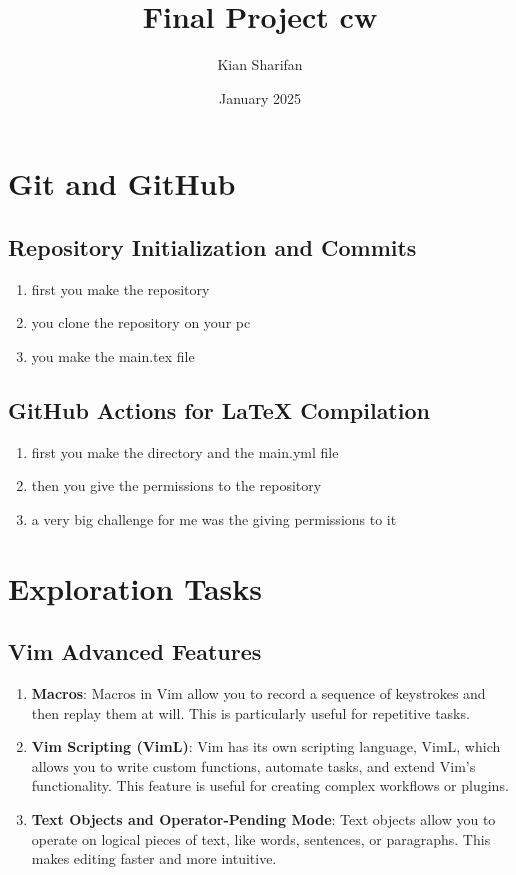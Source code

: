 \documentclass{article}
\title{Final Project cw}
\author{Kian Sharifan}
\date{January 2025}
\begin{document}
\maketitle
\newpage
\tableofcontents
\newpage

\section{Git and GitHub}
\subsection{Repository Initialization and Commits}
\begin{enumerate}
    \item first you make the repository
    \item you clone the repository on your pc
    \item you make the main.tex file
\end{enumerate}
\subsection{GitHub Actions for LaTeX Compilation}
\begin{enumerate}
    \item first you make the directory and the main.yml file
    \item then you give the permissions to the repository
    \item a very big challenge for me was the giving permissions to it
\end{enumerate}

\section{Exploration Tasks}
\subsection{Vim Advanced Features}
\begin{enumerate}
    \item \textbf{Macros}:
    Macros in Vim allow you to record a sequence of keystrokes and then replay them at will. This is particularly useful for repetitive tasks.
    \item \textbf{Vim Scripting (VimL)}:
    Vim has its own scripting language, VimL, which allows you to write custom functions, automate tasks, and extend Vim’s functionality. This feature is useful for creating complex workflows or plugins.
    \item \textbf{Text Objects and Operator-Pending Mode}:
    Text objects allow you to operate on logical pieces of text, like words, sentences, or paragraphs. This makes editing faster and more intuitive.
\end{enumerate}
\end{document}
